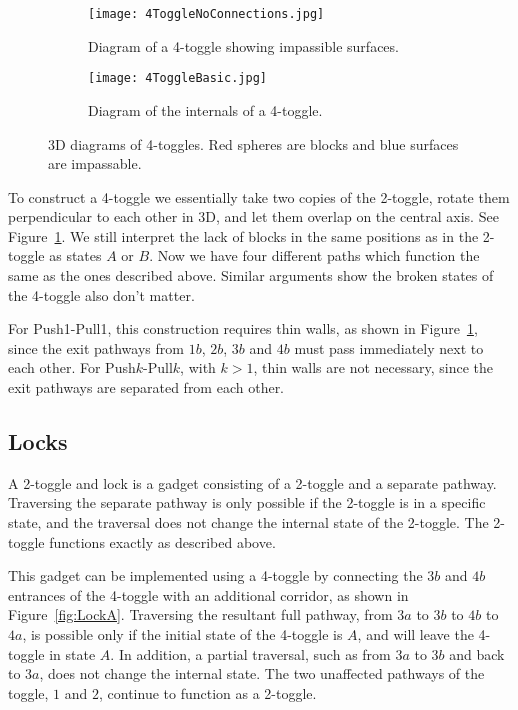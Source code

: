 \begin{figure}[!ht]
  \centering
  \begin{subfigure}[t]{.45\textwidth}
    \texttt{[image: 4ToggleNoConnections.jpg]}
    \caption{Diagram of a 4-toggle showing impassible surfaces.}
    \label{fig:4Toggle3D}
  \end{subfigure}
  \hfill
  \begin{subfigure}[t]{.45\textwidth}
    \texttt{[image: 4ToggleBasic.jpg]}
    \caption{Diagram of the internals of a 4-toggle.}
    \label{fig:4Toggle3DBasic}
  \end{subfigure}
  \caption{3D diagrams of 4-toggles. Red spheres are blocks and blue surfaces are impassable.}
\end{figure}

To construct a 4-toggle we essentially take two copies of the 2-toggle, rotate them perpendicular to each other in 3D, and let them overlap on the central axis. See Figure~\ref{fig:4Toggle3D}. We still interpret the lack of blocks in the same positions as in the 2-toggle as states $A$ or $B$. Now we have four different paths which function the same as the ones described above. Similar arguments show the broken states of the 4-toggle also don't matter.

For Push1-Pull1, this construction requires thin walls, as shown in Figure~\ref{fig:4Toggle3D}, since the exit pathways from $1b$, $2b$, $3b$ and $4b$ must pass immediately next to each other. For Push$k$-Pull$k$, with $k > 1$, thin walls are not necessary, since the exit pathways are separated from each other.
\subsection{Locks}


A 2-toggle and lock is a gadget consisting of a 2-toggle and a separate pathway. Traversing the separate pathway is only possible if the 2-toggle is in a specific state, and the traversal does not change the internal state of the 2-toggle. The 2-toggle functions exactly
as described above.

This gadget can be implemented using a 4-toggle by
connecting the $3b$ and $4b$ entrances of the 4-toggle with an additional corridor, as shown in Figure~\ref{fig:LockA}.
Traversing the resultant full pathway, from $3a$ to $3b$ to $4b$ to $4a$, is possible only if the initial
state of the 4-toggle is $A$, and will leave the 4-toggle in state $A$. In addition, a partial traversal,
such as from $3a$ to $3b$ and back to $3a$, does not change the internal state. The two unaffected
pathways of the toggle, $1$ and $2$, continue to function as a 2-toggle.

